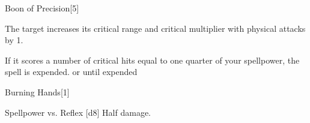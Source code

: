 \begin{spellsection}{Boon of Precision}[5]
    \begin{spellheader}
    \end{spellheader}
    \begin{spellcontent}
        \begin{spelltargetinginfo}
        \end{spelltargetinginfo}
        \begin{spelleffects}
            \spelleffect The target increases its critical range and critical multiplier with physical attacks by 1.

            If it scores a number of critical hits equal to one quarter of your spellpower, the spell is expended.
            \spelldur \durshort or until expended
        \end{spelleffects}
    \end{spellcontent}
    \begin{spellfooter}
        \miscastrandom
    \end{spellfooter}
\end{spellsection}

\begin{spellsection}{Burning Hands}[1]
    \begin{spellheader}
    \end{spellheader}
    \begin{spellcontent}
        \begin{spelltargetinginfo}
        \end{spelltargetinginfo}
        \begin{spelleffects}
            \begin{spellattack}{Spellpower vs. Reflex}
                \spellsuccess {}[d8]
                \spellfailure Half damage.
            \end{spellattack}
        \end{spelleffects}
    \end{spellcontent}
    \begin{spellfooter}
        \miscastexplode
    \end{spellfooter}
\end{spellsection}

